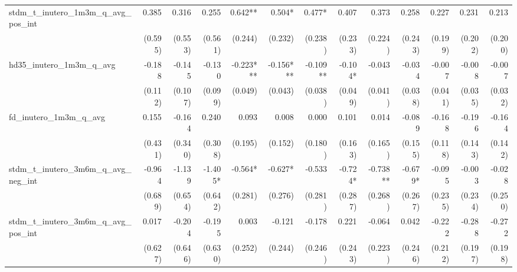 \begin{tabular}{lrrrrrrrrrrrr}
stdm\_t\_inutero\_1m3m\_q\_avg\_pos\_int    &        0.385 &        0.316 &        0.255 &      0.642** &       0.504* &       0.477* &        0.407 &        0.373 &        0.258 &        0.227 &        0.231 &        0.213 \\ 
                                            &      (0.595) &      (0.553) &      (0.561) &      (0.244) &      (0.232) &      (0.238) &      (0.233) &      (0.224) &      (0.243) &      (0.199) &      (0.202) &      (0.200) \\ 
hd35\_inutero\_1m3m\_q\_avg                 &       -0.188 &       -0.145 &       -0.130 &    -0.223*** &    -0.156*** &     -0.109** &      -0.104* &       -0.043 &       -0.034 &       -0.007 &       -0.008 &       -0.007 \\ 
                                            &      (0.112) &      (0.107) &      (0.099) &      (0.049) &      (0.043) &      (0.038) &      (0.049) &      (0.041) &      (0.038) &      (0.041) &      (0.035) &      (0.032) \\ 
fd\_inutero\_1m3m\_q\_avg                   &        0.155 &       -0.164 &        0.240 &        0.093 &        0.008 &        0.000 &        0.101 &        0.014 &       -0.089 &       -0.168 &       -0.196 &       -0.164 \\ 
                                            &      (0.431) &      (0.340) &      (0.308) &      (0.195) &      (0.152) &      (0.180) &      (0.163) &      (0.165) &      (0.155) &      (0.118) &      (0.143) &      (0.142) \\ 
stdm\_t\_inutero\_3m6m\_q\_avg\_neg\_int    &       -0.964 &       -1.139 &      -1.405* &      -0.564* &      -0.627* &       -0.533 &      -0.724* &     -0.738** &      -0.679* &       -0.095 &       -0.003 &       -0.028 \\ 
                                            &      (0.689) &      (0.654) &      (0.642) &      (0.281) &      (0.276) &      (0.281) &      (0.287) &      (0.268) &      (0.267) &      (0.235) &      (0.234) &      (0.250) \\ 
stdm\_t\_inutero\_3m6m\_q\_avg\_pos\_int    &        0.017 &       -0.204 &       -0.195 &        0.003 &       -0.121 &       -0.178 &        0.221 &       -0.064 &        0.042 &       -0.222 &       -0.288 &       -0.272 \\ 
                                            &      (0.627) &      (0.646) &      (0.630) &      (0.252) &      (0.244) &      (0.246) &      (0.243) &      (0.223) &      (0.246) &      (0.212) &      (0.197) &      (0.198) \\ 

\end{tabular}
